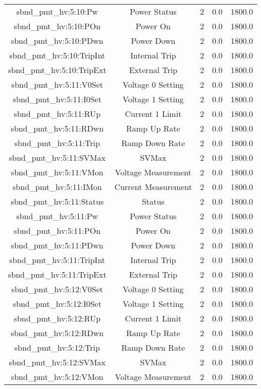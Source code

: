 \begin{table}[ptb]
\begin{tabular}{c | c c c c}
sbnd_pmt_hv:5:10:Pw & Power Status & 2 & 0.0 & 1800.0\\ 
sbnd_pmt_hv:5:10:POn & Power On & 2 & 0.0 & 1800.0\\ 
sbnd_pmt_hv:5:10:PDwn & Power Down & 2 & 0.0 & 1800.0\\ 
sbnd_pmt_hv:5:10:TripInt & Internal Trip & 2 & 0.0 & 1800.0\\ 
sbnd_pmt_hv:5:10:TripExt & External Trip & 2 & 0.0 & 1800.0\\ 
sbnd_pmt_hv:5:11:V0Set & Voltage 0 Setting & 2 & 0.0 & 1800.0\\ 
sbnd_pmt_hv:5:11:I0Set & Voltage 1 Setting & 2 & 0.0 & 1800.0\\ 
sbnd_pmt_hv:5:11:RUp & Current 1 Limit & 2 & 0.0 & 1800.0\\ 
sbnd_pmt_hv:5:11:RDwn & Ramp Up Rate & 2 & 0.0 & 1800.0\\ 
sbnd_pmt_hv:5:11:Trip & Ramp Down Rate & 2 & 0.0 & 1800.0\\ 
sbnd_pmt_hv:5:11:SVMax & SVMax & 2 & 0.0 & 1800.0\\ 
sbnd_pmt_hv:5:11:VMon & Voltage Measurement & 2 & 0.0 & 1800.0\\ 
sbnd_pmt_hv:5:11:IMon & Current Measurement & 2 & 0.0 & 1800.0\\ 
sbnd_pmt_hv:5:11:Status & Status & 2 & 0.0 & 1800.0\\ 
sbnd_pmt_hv:5:11:Pw & Power Status & 2 & 0.0 & 1800.0\\ 
sbnd_pmt_hv:5:11:POn & Power On & 2 & 0.0 & 1800.0\\ 
sbnd_pmt_hv:5:11:PDwn & Power Down & 2 & 0.0 & 1800.0\\ 
sbnd_pmt_hv:5:11:TripInt & Internal Trip & 2 & 0.0 & 1800.0\\ 
sbnd_pmt_hv:5:11:TripExt & External Trip & 2 & 0.0 & 1800.0\\ 
sbnd_pmt_hv:5:12:V0Set & Voltage 0 Setting & 2 & 0.0 & 1800.0\\ 
sbnd_pmt_hv:5:12:I0Set & Voltage 1 Setting & 2 & 0.0 & 1800.0\\ 
sbnd_pmt_hv:5:12:RUp & Current 1 Limit & 2 & 0.0 & 1800.0\\ 
sbnd_pmt_hv:5:12:RDwn & Ramp Up Rate & 2 & 0.0 & 1800.0\\ 
sbnd_pmt_hv:5:12:Trip & Ramp Down Rate & 2 & 0.0 & 1800.0\\ 
sbnd_pmt_hv:5:12:SVMax & SVMax & 2 & 0.0 & 1800.0\\ 
sbnd_pmt_hv:5:12:VMon & Voltage Measurement & 2 & 0.0 & 1800.0\\ 

\end{tabular}
\end{table}
